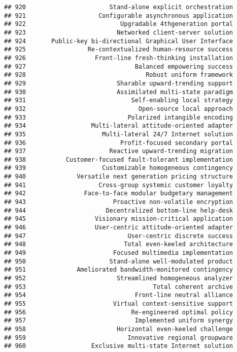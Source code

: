 \documentclass[
]{article}
\begin{document}
\begin{verbatim}
## 920                       Stand-alone explicit orchestration
## 921                    Configurable asynchronous application
## 922                          Upgradable 4thgeneration portal
## 923                         Networked client-server solution
## 924       Public-key bi-directional Graphical User Interface
## 925                 Re-contextualized human-resource success
## 926                   Front-line fresh-thinking installation
## 927                              Balanced empowering success
## 928                                 Robust uniform framework
## 929                         Sharable upward-trending support
## 930                         Assimilated multi-state paradigm
## 931                             Self-enabling local strategy
## 932                               Open-source local approach
## 933                            Polarized intangible encoding
## 934                  Multi-lateral attitude-oriented adapter
## 935                     Multi-lateral 24/7 Internet solution
## 936                          Profit-focused secondary portal
## 937                       Reactive upward-trending migration
## 938           Customer-focused fault-tolerant implementation
## 939                     Customizable homogeneous contingency
## 940              Versatile next generation pricing structure
## 941                    Cross-group systemic customer loyalty
## 942                Face-to-face modular budgetary management
## 943                        Proactive non-volatile encryption
## 944                      Decentralized bottom-line help-desk
## 945                   Visionary mission-critical application
## 946                   User-centric attitude-oriented adapter
## 947                            User-centric discrete success
## 948                           Total even-keeled architecture
## 949                        Focused multimedia implementation
## 950                       Stand-alone well-modulated product
## 951              Ameliorated bandwidth-monitored contingency
## 952                         Streamlined homogeneous analyzer
## 953                                   Total coherent archive
## 954                              Front-line neutral alliance
## 955                        Virtual context-sensitive support
## 956                             Re-engineered optimal policy
## 957                              Implemented uniform synergy
## 958                         Horizontal even-keeled challenge
## 959                            Innovative regional groupware
## 960                  Exclusive multi-state Internet solution

\end{verbatim}
\end{document}
